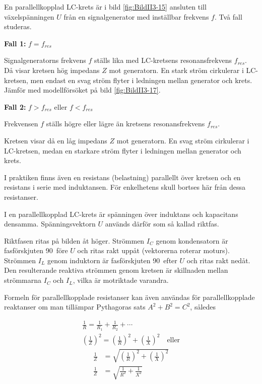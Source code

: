 En parallellkopplad LC-krets är i bild \ref{fig:BildII3-15} ansluten till
växelspänningen \(U\) från en signalgenerator med inställbar frekvens \(f\).
Två fall studeras.

\textbf{Fall 1:} \(f = f_{res}\)

Signalgeneratorns frekvens \(f\) ställs lika med LC-kretsens resonansfrekvens
\(f_{res}\).
Då visar kretsen hög impedans \(Z\) mot generatorn.
En stark ström cirkulerar i LC-kretsen, men endast en svag ström flyter i
ledningen mellan generator och krets.
Jämför med modellförsöket på bild \ref{fig:BildII3-17}.

\textbf{Fall 2:} \(f > f_{res}\) eller \(f < f_{res}\)

Frekvensen \(f\) ställs högre eller lägre än kretsens resonansfrekvens
\(f_{res}\).

Kretsen visar då en låg impedans \(Z\) mot generatorn.
En svag ström cirkulerar i LC-kretsen, medan en starkare ström flyter i
ledningen mellan generator och krets.

I praktiken finns även en resistans (belastning) parallellt över kretsen och en
resistans i serie med induktansen.
För enkelhetens skull bortses här från dessa resistanser.

I en parallellkopplad LC-krets är spänningen över induktans och kapacitans
densamma.
Spänningsvektorn \(U\) används därför som så kallad riktfas.

Riktfasen ritas på bilden åt höger.
Strömmen \(I_C\) genom kondensatorn är fasförskjuten 90\degree~före \(U\) och
ritas rakt uppåt (vektorerna roterar moturs).
Strömmen \(I_L\) genom induktorn är fasförskjuten 90\degree~efter \(U\) och
ritas rakt nedåt.
Den resulterande reaktiva strömmen genom kretsen är skillnaden mellan
strömmarna \(I_C\) och \(I_L\), vilka är motriktade varandra.

Formeln för parallellkopplade resistanser kan även användas för
parallellkopplade reaktanser om man tillämpar Pythagoras sats
\(A^2 + B^2 = C^2\), således

\begin{gather*}
	\frac{1}{R} = \frac{1}{R_1} + \frac{1}{R_2} + \cdots \\
	\left(\frac{1}{Z}\right)^2 = \left(\frac{1}{R}\right)^2 +
	\left(\frac{1}{X}\right)^2 \quad \text{eller}
\end{gather*}
\begin{align*}
	\frac{1}{Z} &= \sqrt{\left(\frac{1}{R}\right)^2 + \left(\frac{1}{X}\right)^2} \\
	\frac{1}{Z} &= \sqrt{\frac{1}{R^2} + \frac{1}{X^2}}
\end{align*}

